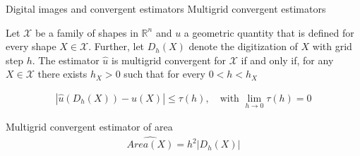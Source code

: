 \begin{frame}
\begin{minipage}[t][0.65\textheight][t]{1\textwidth}
{\begin{tabular}{ccc}
\end{tabular}}%
\end{minipage}
\end{frame}

\begin{frame}
{Digital images and convergent estimators}
{Multigrid convergent estimators}

\begin{definition}
	Let $\mathcal{X}$ be a family of shapes in $\mathbb{R}^n$ and $u$ a geometric quantity that is defined for every shape $X \in \mathcal{X}$. Further, let $D_h(X)$ denote the digitization of $X$ with grid step $h$.%
%
\vspace{1em}	
%	
	 The estimator $\hat{u}$ is multigrid convergent for $\mathcal{X}$ if and only if, for any $X \in \mathcal{X}$ there exists $h_X > 0$ such that for every $0< h < h_X$
	
	\begin{align*}
		| \hat{u}(D_h(X)) - u(X) | \leq \tau(h), \quad \text{with } \lim_{h\rightarrow 0}{\tau(h)} = 0
	\end{align*}	
\end{definition}
%
\pause
%
Multigrid convergent estimator of area
\begin{align*}
	\widehat{Area(X)} = h^2|D_h(X)|
\end{align*}
%
\end{frame}

